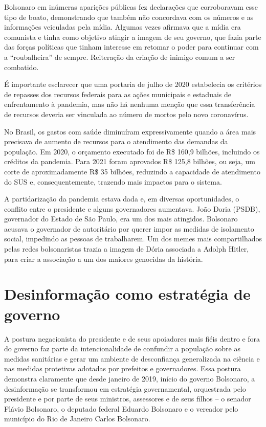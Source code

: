 Bolsonaro em inúmeras aparições públicas fez declarações que
corroboravam esse tipo de boato, demonstrando que também não concordava
com os números e as informações veiculadas pela mídia. Algumas vezes
afirmava que a mídia era comunista e tinha como objetivo atingir a
imagem de seu governo, que fazia parte das forças políticas que tinham
interesse em retomar o poder para continuar com a ``roubalheira'' de
sempre. Reiteração da criação de inimigo comum a ser combatido.

É importante esclarecer que uma portaria de julho de 2020 estabelecia os
critérios de repasses dos recursos federais para as ações municipais e
estaduais de enfrentamento à pandemia, mas não há nenhuma menção que
essa transferência de recursos deveria ser vinculada ao número de mortos
pelo novo coronavírus.

No Brasil, os gastos com saúde diminuíram expressivamente quando a área
mais precisava de aumento de recursos para o atendimento das demandas da
população. Em 2020, o orçamento executado foi de R\$ 160,9 bilhões,
incluindo os créditos da pandemia. Para 2021 foram aprovados R\$ 125,8
bilhões, ou seja, um corte de aproximadamente R\$ 35 bilhões, reduzindo
a capacidade de atendimento do SUS e, consequentemente, trazendo mais
impactos para o sistema.

A partidarização da pandemia estava dada e, em diversas oportunidades, o
conflito entre o presidente e alguns governadores aumentava. João Doria
(PSDB), governador do Estado de São Paulo, era um dos mais atingidos.
Bolsonaro acusava o governador de autoritário por querer impor as
medidas de isolamento social, impedindo as pessoas de trabalharem. Um
dos memes mais compartilhados pelas redes bolsonaristas trazia a imagem
de Dória associada a Adolph Hitler, para criar a associação a um dos
maiores genocidas da história.

\section{Desinformação como estratégia de governo}

A postura negacionista do presidente e de seus apoiadores mais fiéis
dentro e fora do governo faz parte da intencionalidade de confundir a
população sobre as medidas sanitárias e gerar um ambiente de
desconfiança generalizada na ciência e nas medidas protetivas adotadas
por prefeitos e governadores. Essa postura demonstra claramente que
desde janeiro de 2019, início do governo Bolsonaro, a desinformação se
transformou em estratégia governamental, orquestrada pelo presidente e
por parte de seus ministros, assessores e de seus filhos -- o senador
Flávio Bolsonaro, o deputado federal Eduardo Bolsonaro e o vereador pelo
município do Rio de Janeiro Carlos Bolsonaro.

